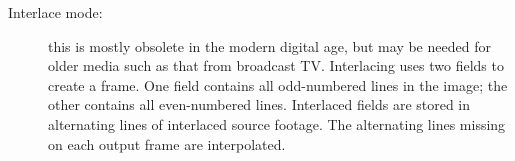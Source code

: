 \begin{description}
    \item[Interlace mode:]
        this is mostly obsolete in the modern digital age, but may be needed for older media such as that from broadcast TV.  Interlacing uses two fields to create a frame. One field contains all odd-numbered lines in the image; the other contains all even-numbered lines.  Interlaced fields are stored in alternating lines of interlaced source footage. The alternating lines missing on each output frame are interpolated.
\end{description}




